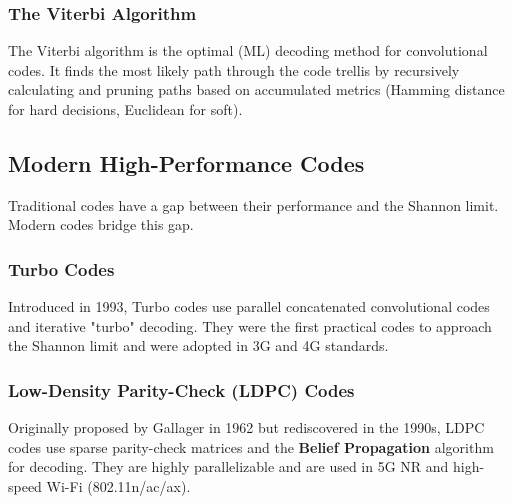 \subsubsection{The Viterbi Algorithm}
The Viterbi algorithm is the optimal (ML) decoding method for convolutional codes. It finds the most likely path through the code trellis by recursively calculating and pruning paths based on accumulated metrics (Hamming distance for hard decisions, Euclidean for soft).

\subsection{Modern High-Performance Codes}
Traditional codes have a gap between their performance and the Shannon limit. Modern codes bridge this gap.

\subsubsection{Turbo Codes}
Introduced in 1993, Turbo codes use parallel concatenated convolutional codes and iterative "turbo" decoding. They were the first practical codes to approach the Shannon limit and were adopted in 3G and 4G standards.

\subsubsection{Low-Density Parity-Check (LDPC) Codes}
Originally proposed by Gallager in 1962 but rediscovered in the 1990s, LDPC codes use sparse parity-check matrices and the \textbf{Belief Propagation} algorithm for decoding. They are highly parallelizable and are used in 5G NR and high-speed Wi-Fi (802.11n/ac/ax).

\begin{center}
\end{center}

